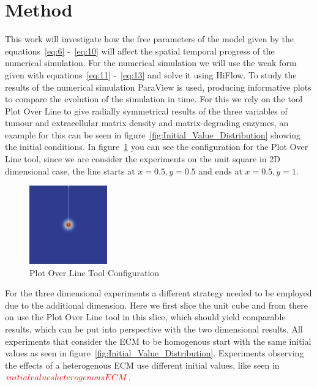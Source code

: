 

\section{Method}\label{sec:method}

This work will investigate how the free parameters of the model given by the equations~\ref{eq:6} -~\ref{eq:10} will affect the spatial temporal progress of the numerical simulation. For the numerical simulation we will use the weak form given with equations~\ref{eq:11} -~\ref{eq:13} and solve it using HiFlow. To study the results of the numerical simulation ParaView is used, producing informative plots to compare the evolution of the simulation in time. For this we rely on the tool Plot Over Line to give radially symmetrical results of the three variables of tumour and extracellular matrix density and matrix-degrading enzymes, an example for this can be seen in figure~\ref{fig:Initial_Value_Distribution} showing the initial conditions. In figure~\ref{fig:PlotOverLine} you can see the configuration for the Plot Over Line tool, since we are consider the experiments on the unit square in 2D dimensional case, the line starts at $x=0.5, y=0.5$ and ends at $x=0.5, y=1$.\newline
\begin{figure}[h]
    \centering
    \includegraphics[width=0.3\textwidth]{resources/images/plot_over_line_tool.png}
    \caption{Plot Over Line Tool Configuration}
    \label{fig:PlotOverLine}
\end{figure}
For the three dimensional experiments a different strategy needed to be employed due to the additional dimension. Here we first slice the unit cube and from there on use the Plot Over Line tool in this slice, which should yield comparable results, which can be put into perspective with the two dimensional results.\newline
All experiments that consider the ECM to be homogenous start with the same initial values as seen in figure~\ref{fig:Initial_Value_Distribution}. Experiments observing the effects of a heterogenous ECM use different initial values, like seen in $\textcolor{red}{initial values heterogenous ECM}$.\newline 
